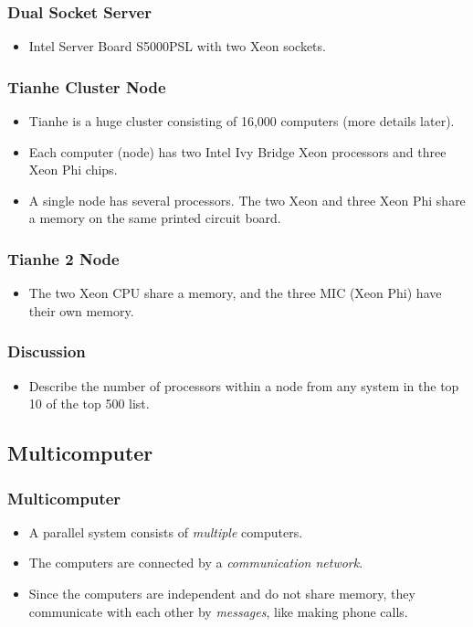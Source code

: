 \documentclass{beamer}
\begin{document}
\begin{CJK}{UTF8}{bsmi}
\begin{frame}
\frametitle{Dual Socket Server}
\begin{itemize}
\item Intel Server Board S5000PSL with two Xeon sockets.
\end{itemize}
\centerline{}
\end{frame}




\begin{frame}
\frametitle{Tianhe Cluster Node}
\begin{itemize}
\item Tianhe is a huge cluster consisting of 16,000 computers (more
  details later).  
\item Each computer (node) has two Intel Ivy Bridge Xeon processors
  and three Xeon Phi chips. 
\item A single node has several processors. The two Xeon and three
  Xeon Phi share a memory on the same printed circuit board.
\end{itemize}
\end{frame}

\begin{frame}
\frametitle{Tianhe 2 Node}
\begin{itemize}
\item The two Xeon CPU share a memory, and the three MIC (Xeon Phi)
  have their own memory.
\end{itemize}
\centerline{}
\end{frame}

\begin{frame}
\frametitle{Discussion} 
\begin{itemize}
\item Describe the number of processors within a node from any system
  in the top 10 of the top 500 list.
\end{itemize}
\end{frame}


\subsection{Multicomputer}

\begin{frame}
\frametitle{Multicomputer} 
\begin{itemize}
\item A parallel system consists of {\em multiple} computers.
\item The computers are connected by a {\em communication network}.
\item Since the computers are independent and do not share memory,
  they communicate with each other by {\em messages}, like making
  phone calls.
\end{itemize}
\end{frame}


\end{CJK}
\end{document}
